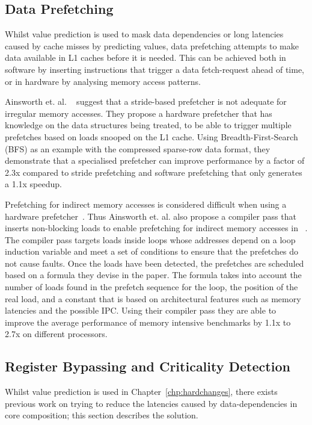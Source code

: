 \subsection{Data Prefetching}
Whilst value prediction is used to mask data dependencies or long latencies caused by cache misses by predicting values, data prefetching attempts to make data available in L1 caches before it is needed.
This can be achieved both in software by inserting instructions that trigger a data fetch-request ahead of time, or in hardware by analysing memory access patterns.

Ainsworth et. al. ~\cite{graphPrefetch2016} suggest that a stride-based prefetcher is not adequate for irregular memory accesses.
They propose a hardware prefetcher that has knowledge on the data structures being treated, to be able to trigger multiple prefetches based on loads snooped on the L1 cache.
Using Breadth-First-Search (BFS) as an example with the compressed sparse-row data format, they demonstrate that a specialised prefetcher can improve performance by a factor of 2.3x compared to stride prefetching and software prefetching that only generates a 1.1x speedup.

Prefetching for indirect memory accesses is considered difficult when using a hardware prefetcher~\cite{lee2012whenprefetchworks,prefetchForIndirect2017}.
Thus Ainsworth et. al. also propose a compiler pass that inserts non-blocking loads to enable prefetching for indirect memory accesses in ~\cite{prefetchForIndirect2017}.
The compiler pass targets loads inside loops whose addresses depend on a loop induction variable and meet a set of conditions to ensure that the prefetches do not cause faults.
Once the loads have been detected, the prefetches are scheduled based on a formula they devise in the paper.
The formula takes into account the number of loads found in the prefetch sequence for the loop, the position of the real load, and a constant that is based on architectural features such as memory latencies and the possible IPC.
Using their compiler pass they are able to improve the average performance of memory intensive benchmarks by 1.1x to 2.7x on different processors.
\vspace{-1em}
\subsection{Register Bypassing and Criticality Detection}
Whilst value prediction is used in Chapter~\ref{chp:hardchanges}, there exists previous work on trying to reduce the latencies caused by data-dependencies in core composition; this section describes the solution.

